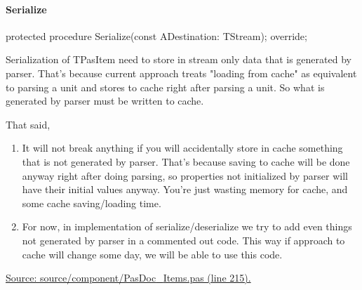 \documentclass{report}
\newif\ifpdf
\begin{document}
\paragraph*{Serialize}\hspace*{\fill}

\label{PasDoc_Items.TBaseItem-Serialize}
\begin{list}{}{
\setlength{\itemindent}{0cm}
\setlength{\listparindent}{0cm}
\setlength{\leftmargin}{\evensidemargin}
\addtolength{\leftmargin}{\tmplength}
\settowidth{\labelsep}{X}
\addtolength{\leftmargin}{\labelsep}
\setlength{\labelwidth}{\tmplength}
}
\item[\textbf{Declaration}\hfill]
\ifpdf
\begin{flushleft}
\fi
\begin{ttfamily}
protected procedure Serialize(const ADestination: TStream); override;\end{ttfamily}

\ifpdf
\end{flushleft}
\fi

\par
\item[\textbf{Description}]
Serialization of TPasItem need to store in stream only data that is generated by parser. That's because current approach treats "loading from cache" as equivalent to parsing a unit and stores to cache right after parsing a unit. So what is generated by parser must be written to cache.

That said,

\begin{enumerate}
\setcounter{enumi}{0} \setcounter{enumii}{0} \setcounter{enumiii}{0} \setcounter{enumiv}{0} 
\item  It will not break anything if you will accidentally store in cache something that is not generated by parser. That's because saving to cache will be done anyway right after doing parsing, so properties not initialized by parser will have their initial values anyway. You're just wasting memory for cache, and some cache saving/loading time.
\setcounter{enumi}{1} \setcounter{enumii}{1} \setcounter{enumiii}{1} \setcounter{enumiv}{1} 
\item  For now, in implementation of serialize/deserialize we try to add even things not generated by parser in a commented out code. This way if approach to cache will change some day, we will be able to use this code.
\end{enumerate}\par
\href{https://github.com/pasdoc/pasdoc/blob/master/source/component/PasDoc_Items.pas#L215}{Source: source/component/PasDoc{\_}Items.pas (line 215).}

\end{list}
\end{document}
